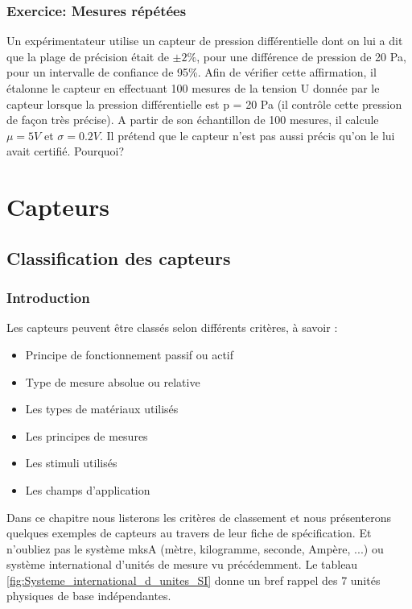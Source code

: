 \subsection{Exercice: Mesures répétées}

Un expérimentateur utilise un capteur de pression différentielle dont on lui a dit que la plage de précision était de $\pm 2\%$, pour une différence de pression de 20 Pa, pour un intervalle de confiance de 95\%. Afin de vérifier cette affirmation, il étalonne le capteur en effectuant 100 mesures de la tension U donnée par le capteur lorsque la pression différentielle est p = 20 Pa (il contrôle cette pression de façon très précise). A partir de son échantillon de 100 mesures, il calcule $\mu = 5V$ et $\sigma = 0.2 V$. Il prétend que le capteur n'est pas aussi précis qu'on le lui avait certifié. Pourquoi?

\chapter{Capteurs}

\section{Classification des capteurs}
\subsection{Introduction}
Les capteurs peuvent être classés selon différents critères, à savoir :
\begin{itemize}\itemsep1pt
\renewcommand{\labelitemi}{$\bullet$}
\item Principe de fonctionnement passif ou actif
\item Type de mesure absolue ou relative
\item Les types de matériaux utilisés
\item Les principes de mesures
\item Les stimuli utilisés
\item Les champs d'application
\end{itemize}

Dans ce chapitre nous listerons les critères de classement et nous présenterons quelques exemples de capteurs au travers de leur fiche de spécification.
Et n'oubliez pas le système mksA (mètre, kilogramme, seconde, Ampère, ...) ou système international d'unités de mesure vu précédemment. Le tableau \ref{fig:Systeme_international_d_unites_SI} donne un bref rappel des 7 unités physiques de base indépendantes.


